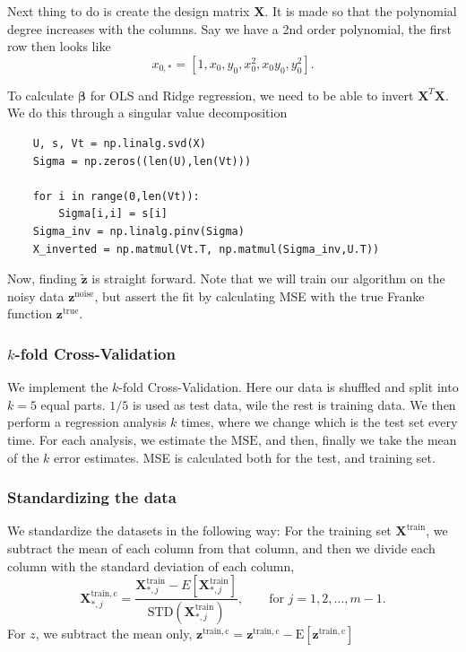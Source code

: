 \documentclass[a4paper,10pt,english]{article}
\begin{document}
Next thing to do is create the design matrix $\bm{X}$. It is made so that the polynomial degree increases with the columns. Say we have a 2nd order polynomial, the first row then looks like
\begin{equation*}
x_{0,*} = [1, x_0, y_0, x_0^2, x_0y_0, y_0^2].
\end{equation*} 

To calculate $\bm{{\beta}}$ for OLS and Ridge regression, we need to be able to invert $\bm{X}^T\bm{X}$. We do this through a singular value decomposition
\begin{verbatim}
	U, s, Vt = np.linalg.svd(X)
	Sigma = np.zeros((len(U),len(Vt)))
	
	for i in range(0,len(Vt)):
		Sigma[i,i] = s[i]
	Sigma_inv = np.linalg.pinv(Sigma)
	X_inverted = np.matmul(Vt.T, np.matmul(Sigma_inv,U.T))
\end{verbatim}

Now, finding $\bm{{\tilde z}}$ is straight forward. Note that we will train our algorithm on the noisy data $\bm{z}^\mathrm{noise}$, but assert the fit by calculating MSE with the true Franke function $\bm{z}^\mathrm{true}$.

\subsubsection{$k$-fold Cross-Validation}
We implement the $k$-fold Cross-Validation. Here our data is shuffled and split into $k=5$ equal parts. $1/5$ is used as test data, wile the rest is training data. We then perform a regression analysis $k$ times, where we change which is the test set every time. For each analysis, we estimate the $\mathrm{MSE}$, and then, finally we take the mean of the $k$ error estimates. MSE is calculated both for the test, and training set.

\subsubsection{Standardizing the data}
We standardize the datasets in the following way: For the training set $\bm{X^\mathrm{train}}$,  we subtract the mean of each column from that column, and then we divide each column with the standard deviation of each column,
\begin{equation}
\bm{X}_{*,j}^\mathrm{train,c} = \frac{\bm{X}_{*,j}^\mathrm{train}-E[\bm{X}_{*,j}^\mathrm{train}]}{\mathrm{STD}(\bm{X}_{*,j}^\mathrm{train})}, \qquad\text{for } j=1,2,\dots, m-1.
\end{equation}
For $z$, we subtract the mean only, $\bm{z}^\mathrm{train,c}= \bm{z}^\mathrm{train,c}- \mathrm{E}[\bm{z}^\mathrm{train,c}]$
\end{document}
